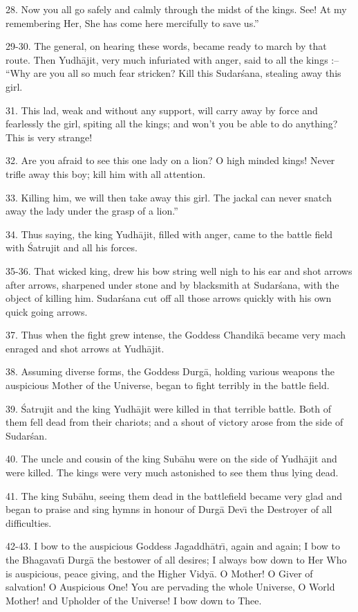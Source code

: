 28. Now you all go safely and calmly through the midst of the kings. See! At my remembering Her, She has come here mercifully to save us.''

29-30. The general, on hearing these words, became ready to march by that route. Then Yudh\=ajit, very much infuriated with anger, said to all the kings :-- ``Why are you all so much fear stricken? Kill this Sudar\'sana, stealing away this girl.

31. This lad, weak and without any support, will carry away by force and fearlessly the girl, spiting all the kings; and won't you be able to do anything? This is very strange!

32. Are you afraid to see this one lady on a lion? O high minded kings! Never trifle away this boy; kill him with all attention.

33. Killing him, we will then take away this girl. The jackal can never snatch away the lady under the grasp of a lion.''

34. Thus saying, the king Yudh\=ajit, filled with anger, came to the battle field with \'Satrujit and all his forces.

35-36. That wicked king, drew his bow string well nigh to his ear and shot arrows after arrows, sharpened under stone and by blacksmith at Sudar\'sana, with the object of killing him. Sudar\'sana cut off all those arrows quickly with his own quick going arrows.

37. Thus when the fight grew intense, the Goddess Chandik\=a became very mach enraged and shot arrows at Yudh\=ajit.

38. Assuming diverse forms, the Goddess Durg\=a, holding various weapons the auspicious Mother of the Universe, began to fight terribly in the battle field.

39. \'Satrujit and the king Yudh\=ajit were killed in that terrible battle. Both of them fell dead from their chariots; and a shout of victory arose from the side of Sudar\'san.

40. The uncle and cousin of the king Sub\=ahu were on the side of Yudh\=ajit and were killed. The kings were very much astonished to see them thus lying dead.

41. The king Sub\=ahu, seeing them dead in the battlefield became very glad and began to praise and sing hymns in honour of Durg\=a Dev\={\i} the Destroyer of all difficulties.

42-43. I bow to the auspicious Goddess Jagaddh\=atr\={\i}, again and again; I bow to the Bhagavat\={\i} Durg\=a the bestower of all desires; I always bow down to Her Who is auspicious, peace giving, and the Higher Vidy\=a. O Mother! O Giver of salvation! O Auspicious One! You are pervading the whole Universe, O World Mother! and Upholder of the Universe! I bow down to Thee.

